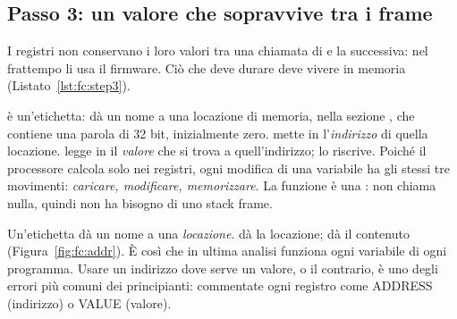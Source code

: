 \subsection{Passo 3: un valore che sopravvive tra i frame}

I registri non conservano i loro valori tra una chiamata di  e la
successiva: nel frattempo li usa il firmware. Ciò che deve durare deve vivere
in memoria (Listato~\ref{lst:fc:step3}).


 è un'etichetta: dà un nome a una locazione di memoria, nella
sezione , che contiene una parola di 32 bit, inizialmente zero.
 mette in  l'\emph{indirizzo} di quella locazione. 
legge in  il \emph{valore} che si trova a quell'indirizzo;  lo
riscrive. Poiché il processore calcola solo nei registri, ogni modifica di una
variabile ha gli stessi tre movimenti: \emph{caricare, modificare,
memorizzare}. La funzione è una : non chiama nulla, quindi non ha
bisogno di uno stack frame.

\begin{prgconcept}
Un'etichetta dà un nome a una \emph{locazione}.  dà la locazione;
 dà il contenuto (Figura~\ref{fig:fc:addr}). È così che in ultima
analisi funziona ogni variabile di ogni programma. Usare un indirizzo dove
serve un valore, o il contrario, è uno degli errori più comuni dei
principianti: commentate ogni registro come ADDRESS (indirizzo) o VALUE
(valore).
\end{prgconcept}

